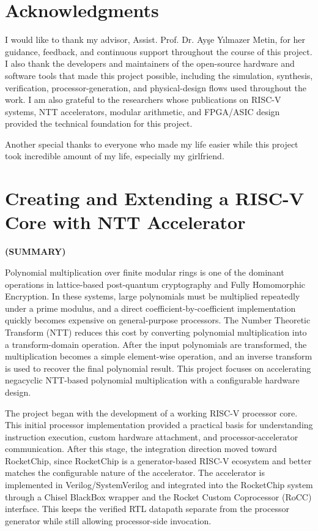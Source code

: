 \documentclass[a4paper, 12pt, titlepage]{article}
\newcommand{\thetitle}{Creating and Extending a RISC-V Core with NTT Accelerator}
\begin{document}
\newpage
\section*{Acknowledgments}
I would like to thank my advisor, Assist. Prof. Dr. Ayşe Yılmazer Metin, for her guidance, feedback, and continuous support throughout the course of this project. I also thank the developers and maintainers of the open-source hardware and software tools that made this project possible, including the simulation, synthesis, verification, processor-generation, and physical-design flows used throughout the work. I am also grateful to the researchers whose publications on RISC-V systems, NTT accelerators, modular arithmetic, and FPGA/ASIC design provided the technical foundation for this project.

Another special thanks to everyone who made my life easier while this project took incredible amount of my life, especially my girlfriend.

\newpage
\section*{\centering\thetitle}
\centerline{\fontsize{16pt}{21.6pt}\sffamily\bfseries (SUMMARY)}

Polynomial multiplication over finite modular rings is one of the dominant operations in lattice-based post-quantum cryptography and Fully Homomorphic Encryption. In these systems, large polynomials must be multiplied repeatedly under a prime modulus, and a direct coefficient-by-coefficient implementation quickly becomes expensive on general-purpose processors. The Number Theoretic Transform (NTT) reduces this cost by converting polynomial multiplication into a transform-domain operation. After the input polynomials are transformed, the multiplication becomes a simple element-wise operation, and an inverse transform is used to recover the final polynomial result. This project focuses on accelerating negacyclic NTT-based polynomial multiplication with a configurable hardware design.

The project began with the development of a working RISC-V processor core. This initial processor implementation provided a practical basis for understanding instruction execution, custom hardware attachment, and processor-accelerator communication. After this stage, the integration direction moved toward RocketChip, since RocketChip is a generator-based RISC-V ecosystem and better matches the configurable nature of the accelerator. The accelerator is implemented in Verilog/SystemVerilog and integrated into the RocketChip system through a Chisel BlackBox wrapper and the Rocket Custom Coprocessor (RoCC) interface. This keeps the verified RTL datapath separate from the processor generator while still allowing processor-side invocation.
\end{document}

